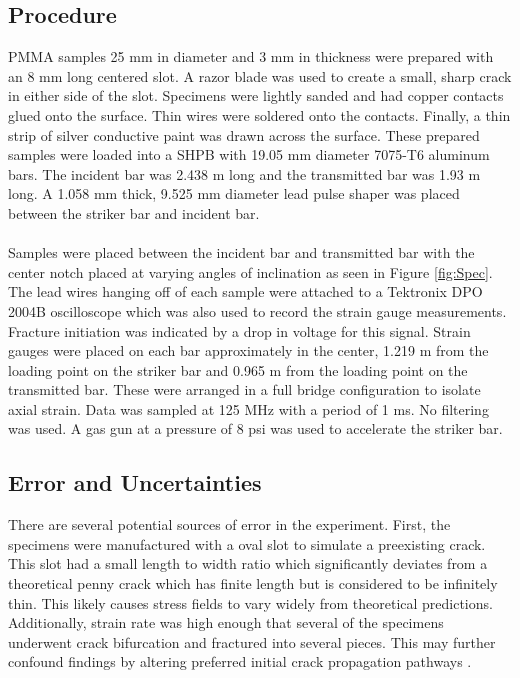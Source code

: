 \documentclass[12pt]{article}
\begin{document}
\subsection{Procedure} %
PMMA samples 25 mm in diameter and 3 mm in thickness were prepared with an 8 mm long centered slot. A razor blade was used to create a small, sharp crack in either side of the slot. Specimens were lightly sanded and had copper contacts glued onto the surface. Thin wires were soldered onto the contacts. Finally, a thin strip of silver conductive paint was drawn across the surface. These prepared samples were loaded into a SHPB with 19.05 mm diameter 7075-T6 aluminum bars. The incident bar was 2.438 m long and the transmitted bar was 1.93 m long. A 1.058 mm thick, 9.525 mm diameter lead pulse shaper was placed between the striker bar and incident bar.
\\ \\
Samples were placed between the incident bar and transmitted bar with the center notch placed at varying angles of inclination as seen in Figure \ref{fig:Spec}. The lead wires hanging off of each sample were attached to a Tektronix DPO 2004B oscilloscope which was also used to record the strain gauge measurements. Fracture initiation was indicated by a drop in voltage for this signal. Strain gauges were placed on each bar approximately in the center, 1.219 m from the loading point on the striker bar and 0.965 m from the loading point on the transmitted bar. These were arranged in a full bridge configuration to isolate axial strain. Data was sampled at 125 MHz with a period of 1 ms. No filtering was used. A gas gun at a pressure of 8 psi was used to accelerate the striker bar.

\subsection{Error and Uncertainties} %
There are several potential sources of error in the experiment. First, the specimens were manufactured with a oval slot to simulate a preexisting crack. This slot had a small length to width ratio which significantly deviates from a theoretical penny crack which has finite length but is considered to be infinitely thin. This likely causes stress fields to vary widely from theoretical predictions. Additionally, strain rate was high enough that several of the specimens underwent crack bifurcation and fractured into several pieces. This may further confound findings by altering preferred initial crack propagation pathways \cite{Meggiolaro}. 
\end{document}
